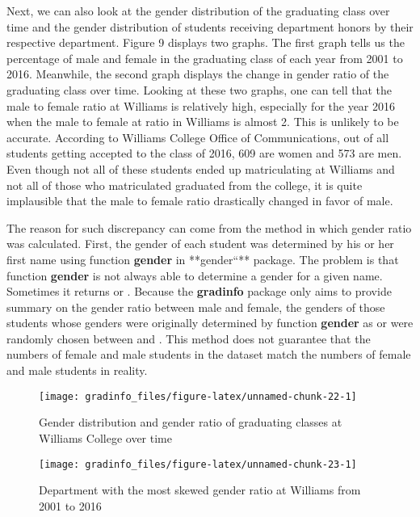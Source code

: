 \newpage

Next, we can also look at the gender distribution of the graduating
class over time and the gender distribution of students receiving
department honors by their respective department. Figure 9 displays two
graphs. The first graph tells us the percentage of male and female in
the graduating class of each year from 2001 to 2016. Meanwhile, the
second graph displays the change in gender ratio of the graduating class
over time. Looking at these two graphs, one can tell that the male to
female ratio at Williams is relatively high, especially for the year
2016 when the male to female at ratio in Williams is almost 2. This is
unlikely to be accurate. According to Williams College Office of
Communications, out of all students getting accepted to the class of
2016, 609 are women and 573 are men. Even though not all of these
students ended up matriculating at Williams and not all of those who
matriculated graduated from the college, it is quite implausible that
the male to female ratio drastically changed in favor of male.

The reason for such discrepancy can come from the method in which gender
ratio was calculated. First, the gender of each student was determined
by his or her first name using function \textbf{gender} in **gender``**
package. The problem is that function \textbf{gender} is not always able
to determine a gender for a given name. Sometimes it returns 
or . Because the \textbf{gradinfo} package only aims to
provide summary on the gender ratio between male and female, the genders
of those students whose genders were originally determined by function
\textbf{gender} as  or  were randomly chosen
between  and . This method does not
guarantee that the numbers of female and male students in the dataset
match the numbers of female and male students in reality.

\begin{Schunk}
\begin{figure}

{\centering \texttt{[image: gradinfo\_files/figure-latex/unnamed-chunk-22-1]} 

}

\caption[Gender distribution and gender ratio of graduating classes at Williams College over time]{Gender distribution and gender ratio of graduating classes at Williams College over time}\label{fig:unnamed-chunk-22}
\end{figure}
\end{Schunk}\begin{Schunk}
\begin{figure}

{\centering \texttt{[image: gradinfo\_files/figure-latex/unnamed-chunk-23-1]} 

}

\caption[Department with the most skewed gender ratio at Williams from 2001 to 2016]{Department with the most skewed gender ratio at Williams from 2001 to 2016}\label{fig:unnamed-chunk-23}
\end{figure}
\end{Schunk}

